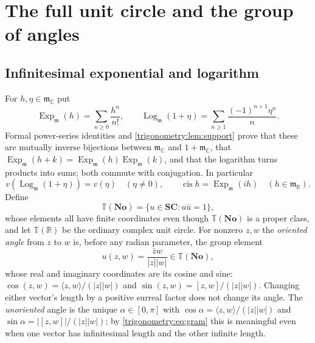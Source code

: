 \documentclass[11pt,letterpaper]{article}
\numberwithin{equation}{section}
\theoremstyle{definition}
\theoremstyle{remark}
\newcommand{\No}{\mathbf{No}}
\newcommand{\SC}{\mathbf{SC}}
\newcommand{\R}{\mathbb R}
\newcommand{\C}{\mathbb C}
\newcommand{\mm}{\mathfrak m}
\newcommand{\TT}{\mathbb T}
\newcommand{\cis}{\operatorname{cis}}
\newcommand{\Ex}{\operatorname{Exp}_{\mm}}
\newcommand{\Logm}{\operatorname{Log}_{\mm}}
\begin{document}
\section{The full unit circle and the group of angles}\label{trigonometry:sec:circle}

\subsection{Infinitesimal exponential and logarithm}
For $h,\eta\in\mm_{\C}$ put
\begin{equation}\label{trigonometry:eq:explog}
 \Ex(h)=\sum_{n\ge0}\frac{h^n}{n!},\qquad
 \Logm(1+\eta)=\sum_{n\ge1}\frac{(-1)^{n+1}\eta^n}{n}.
\end{equation}
Formal power-series identities and \cref{trigonometry:lem:support} prove that these are mutually
inverse bijections between $\mm_{\C}$ and $1+\mm_{\C}$, that $\Ex(h+k)=\Ex(h)\Ex(k)$, and that the
logarithm turns products into sums; both commute with conjugation. In particular
\begin{equation}\label{trigonometry:eq:logleading}
 v(\Logm(1+\eta))=v(\eta)\quad(\eta\ne0),\qquad
 \cis h=\Ex(ih)\quad(h\in\mm_{\R}).
\end{equation}
Define
\[
 \TT(\No)=\{u\in\SC:u\bar u=1\},
\]
whose elements all have finite coordinates even though $\TT(\No)$ is a proper class, and let
$\TT(\R)$ be the ordinary complex unit circle. For nonzero $z,w$ the \emph{oriented angle} from
$z$ to $w$ is, before any radian parameter, the group element
\begin{equation}\label{trigonometry:eq:angleunit}
 u(z,w)=\frac{\bar zw}{|z||w|}\in\TT(\No),
\end{equation}
whose real and imaginary coordinates are its cosine and sine:
$\cos(z,w)=\langle z,w\rangle/(|z||w|)$ and $\sin(z,w)=[z,w]/(|z||w|)$. Changing either vector's
length by a positive surreal factor does not change its angle. The \emph{unoriented} angle is the
unique $\alpha\in[0,\pi]$ with $\cos\alpha=\langle z,w\rangle/(|z||w|)$ and
$\sin\alpha=|[z,w]|/(|z||w|)$; by \cref{trigonometry:eq:gram} this is meaningful even when one
vector has infinitesimal length and the other infinite length.
\end{document}
